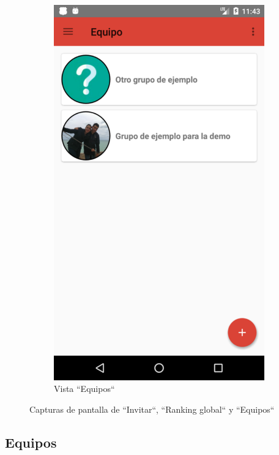 \documentclass[twoside]{report}
\begin{document}
\begin{figure}[H]
\begin{center}
\begin{subfigure}[t]{.3\linewidth}
		\includegraphics[scale=0.2]{images/userguide/13.png}
		\caption{Vista “Equipos“}
	\end{subfigure}\hspace{2mm}%
\caption{Capturas de pantalla de “Invitar“, “Ranking global“ y “Equipos“}
\end{center}
\end{figure}

\subsection{Equipos}
\end{document}
